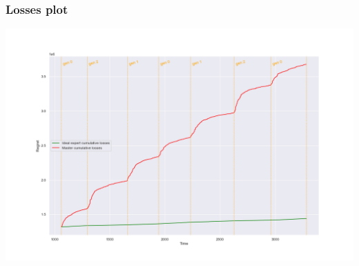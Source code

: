 


\begin{frame}
\frametitle{Losses plot}
\includegraphics[width=1\linewidth]{fig}

\end{frame}


%

